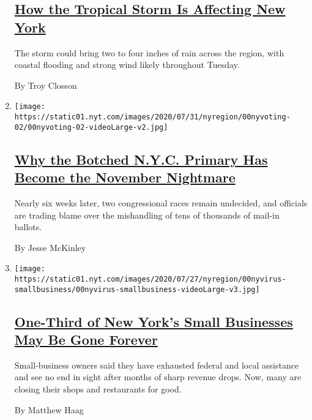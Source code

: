 \begin{enumerate}
  \hypertarget{how-the-tropical-storm-is-affecting-new-york}{%
  \subsection{\texorpdfstring{\href{/2020/08/04/nyregion/isaias-tropical-storm-nyc.html}{How
  the Tropical Storm Is Affecting New
  York}}{How the Tropical Storm Is Affecting New York}}\label{how-the-tropical-storm-is-affecting-new-york}}

  The storm could bring two to four inches of rain across the region,
  with coastal flooding and strong wind likely throughout Tuesday.~

  By Troy Closson
\item
  \texttt{[image: https://static01.nyt.com/images/2020/07/31/nyregion/00nyvoting-02/00nyvoting-02-videoLarge-v2.jpg]}

  \hypertarget{why-the-botched-nyc-primary-has-become-the-november-nightmare}{%
  \subsection{\texorpdfstring{\href{/2020/08/03/nyregion/nyc-mail-ballots-voting.html}{Why
  the Botched N.Y.C. Primary Has Become the November
  Nightmare}}{Why the Botched N.Y.C. Primary Has Become the November Nightmare}}\label{why-the-botched-nyc-primary-has-become-the-november-nightmare}}

  Nearly six weeks later, two congressional races remain undecided, and
  officials are trading blame over the mishandling of tens of thousands
  of mail-in ballots.

  By Jesse McKinley
\item
  \texttt{[image: https://static01.nyt.com/images/2020/07/27/nyregion/00nyvirus-smallbusiness/00nyvirus-smallbusiness-videoLarge-v3.jpg]}

  \hypertarget{one-third-of-new-yorks-small-businesses-may-be-gone-forever}{%
  \subsection{\texorpdfstring{\href{/2020/08/03/nyregion/nyc-small-businesses-closing-coronavirus.html}{One-Third
  of New York's Small Businesses May Be Gone
  Forever}}{One-Third of New York's Small Businesses May Be Gone Forever}}\label{one-third-of-new-yorks-small-businesses-may-be-gone-forever}}

  Small-business owners said they have exhausted federal and local
  assistance and see no end in sight after months of sharp revenue
  drops. Now, many are closing their shops and restaurants for good.

  By Matthew Haag
\end{enumerate}

